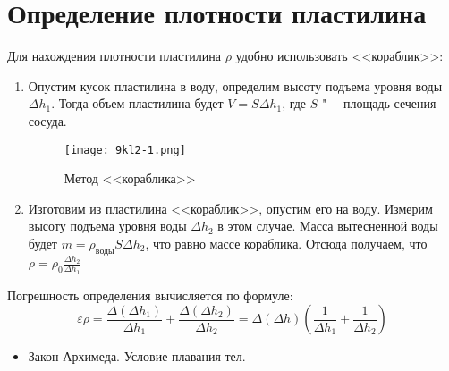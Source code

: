 \section{Определение плотности пластилина}
\SolveVariant
Для нахождения плотности пластилина \(\rho\) удобно использовать <<кораблик>>:
\begin{enumerate}
  \item Опустим кусок пластилина в воду, определим высоту подъема уровня воды \(\Delta h_1\). Тогда объем пластилина будет \(V=S\Delta h_1\), где \(S\) "--- площадь сечения сосуда.
  \begin{figure}[h]
    \centering
    \texttt{[image: 9kl2-1.png]}
    \caption{Метод <<кораблика>>}
  \end{figure}
  \item Изготовим из пластилина <<кораблик>>, опустим его на воду. Измерим высоту подъема уровня воды \(\Delta h_2\) в этом случае. Масса вытесненной воды будет \(m=\rho_\text{воды} S\Delta h_2 \), что равно массе кораблика. Отсюда получаем, что \( \rho = \rho_0 \frac{\Delta h_2}{\Delta h_1}\)
\end{enumerate}
\MesErrors
Погрешность определения вычисляется по формуле:
\begin{equation*}
\varepsilon \rho = \frac{\Delta(\Delta h_1)}{\Delta h_1} + \frac{\Delta(\Delta h_2)}{\Delta h_2}=\Delta(\Delta h) \left( \frac{1}{\Delta h_1} + \frac{1}{\Delta h_2} \right)
\end{equation*}
\SchoolBase
\begin{itemize}
  \item Закон Архимеда. Условие плавания тел.
\end{itemize}
\AdditionalQuestions
